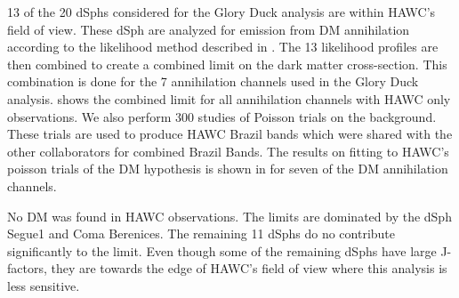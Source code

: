13 of the 20 dSphs considered for the Glory Duck analysis are within HAWC's field of view.
These dSph are analyzed for emission from DM annihilation according to the likelihood method described in .
The 13 likelihood profiles are then combined to create a combined limit on the dark matter cross-section.
This combination is done for the 7 annihilation channels used in the Glory Duck analysis.
 shows the combined limit for all annihilation channels with HAWC only observations.
We also perform 300 studies of Poisson trials on the background.
These trials are used to produce HAWC Brazil bands which were shared with the other collaborators for combined Brazil Bands.
The results on fitting to HAWC's poisson trials of the DM hypothesis is shown in  for seven of the DM annihilation channels.

No DM was found in HAWC observations.
The limits are dominated by the dSph Segue1 and Coma Berenices.
The remaining 11 dSphs do no contribute significantly to the limit.
Even though some of the remaining dSphs have large J-factors, they are towards the edge of HAWC's field of view where this analysis is less sensitive.

